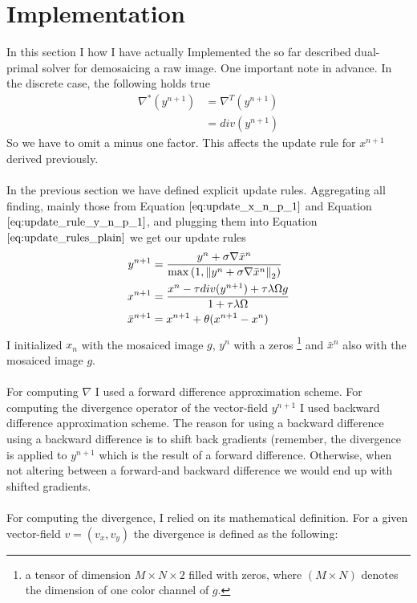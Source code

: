 \section{Implementation}
In this section I how I have actually Implemented the so far described dual-primal solver for demosaicing a raw image. One important note in advance. In the discrete case, the following holds true 
\begin{align}
	\nabla^* (y^{n+1}) 
	&= \nabla^{T} (y^{n+1}) \nonumber \\
	&= div(y^{n+1})
\end{align}
So we have to omit a minus one factor. This affects the update rule for $x^{n+1}$ derived previously. \\ \\
In the previous section we have defined explicit update rules. Aggregating all finding, mainly those from Equation $\ref{eq:update_x_n_p_1}$ and Equation $\ref{eq:update_rule_y_n_p_1}$, and plugging them into Equation $\ref{eq:update_rules_plain}$ we get our update rules
\begin{align}
	y^{n+1} &= \frac{y^n + \sigma \nabla \bar{x}^{n}}{\max{\left(1,\left\lVert y^n + \sigma \nabla \bar{x}^{n}\right\rVert_2 \right)}} \nonumber \\
	x^{n+1} &= \frac{x^n - \tau div(y^{n+1}) +  \tau \lambda \Omega g}{1+\tau \lambda \Omega} \\
	\bar{x}^{n+1} &= x^{n+1} + \theta(x^{n+1} - x^n)
\label{eq:final_update_rules_plain}	
\end{align}
I initialized $x_n$ with the mosaiced image $g$, $y^{n}$ with a zeros \footnote{a tensor of dimension $M \times N \times 2$ filled with zeros, where $(M \times N)$ denotes the dimension of one color channel of $g$.} and $\bar{x}^{n}$ also with the mosaiced image $g$. \\ \\
For computing $\nabla$ I used a forward difference approximation scheme. For computing the divergence operator of the vector-field $y^{n+1}$ I used backward difference approximation scheme. The reason for using a backward difference using a backward difference is to shift back gradients (remember, the divergence is applied to $y^{n+1}$ which is the result of a forward difference. Otherwise, when not altering between a forward-and backward difference we would end up with shifted gradients. \\ \\
For computing the divergence, I relied on its mathematical definition. For a given vector-field $v = (v_x, v_y)$ the divergence is defined as the following:
